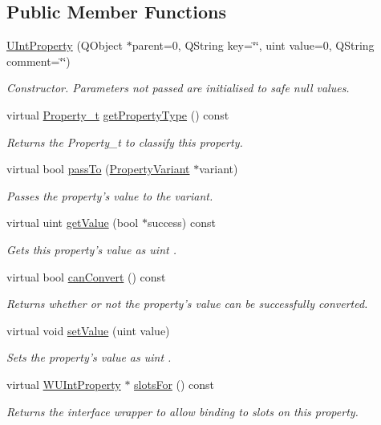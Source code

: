 \subsection*{Public Member Functions}
\begin{DoxyCompactItemize}
\item 
\hyperlink{class_u_int_property_a6f8d978c3fe5ba65656323690a2c580b}{U\-Int\-Property} (Q\-Object $\ast$parent=0, Q\-String key=\char`\"{}\char`\"{}, uint value=0, Q\-String comment=\char`\"{}\char`\"{})
\begin{DoxyCompactList}\small\item\em Constructor. Parameters not passed are initialised to safe null values. \end{DoxyCompactList}\item 
virtual \hyperlink{group___property_classes_ga38f1ccddda12c7cb50b868c9f789ee37}{Property\-\_\-t} \hyperlink{class_u_int_property_a3c42cb68115d9ac7fec4887de32d867e}{get\-Property\-Type} () const 
\begin{DoxyCompactList}\small\item\em Returns the Property\-\_\-t to classify this property. \end{DoxyCompactList}\item 
virtual bool \hyperlink{class_u_int_property_a05bc135083b0c2aa2ced87c2bff1ec19}{pass\-To} (\hyperlink{class_property_variant}{Property\-Variant} $\ast$variant)
\begin{DoxyCompactList}\small\item\em Passes the property's value to the variant. \end{DoxyCompactList}\item 
virtual uint \hyperlink{class_u_int_property_a9f1ce8733358de31a642990168f3f61d}{get\-Value} (bool $\ast$success) const 
\begin{DoxyCompactList}\small\item\em Gets this property's value as uint . \end{DoxyCompactList}\item 
virtual bool \hyperlink{class_u_int_property_a3f9986864fcd8cbfefd69245dc7aadfe}{can\-Convert} () const 
\begin{DoxyCompactList}\small\item\em Returns whether or not the property's value can be successfully converted. \end{DoxyCompactList}\item 
virtual void \hyperlink{class_u_int_property_a074ce84b6839d2451a3abee9da289198}{set\-Value} (uint value)
\begin{DoxyCompactList}\small\item\em Sets the property's value as uint . \end{DoxyCompactList}\item 
virtual \hyperlink{class_w_u_int_property}{W\-U\-Int\-Property} $\ast$ \hyperlink{class_u_int_property_a8625bb395e98f5db5b4963a40d7ced32}{slots\-For} () const 
\begin{DoxyCompactList}\small\item\em Returns the interface wrapper to allow binding to slots on this property. \end{DoxyCompactList}\end{DoxyCompactItemize}
